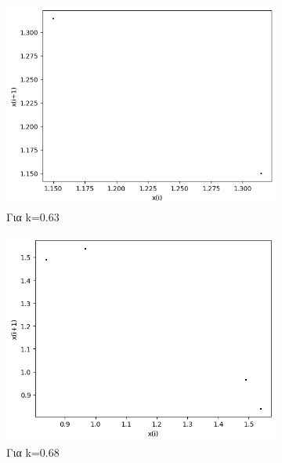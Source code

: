\begin{figure}[h!]
\begin{subfigure}[b]{0.25\textwidth}
		\centering
		\includegraphics[width=\textwidth]{LateX images/graphs q12/g5}
		\caption{Για k=0.63}
		\label{f:k61}
	\end{subfigure}
	\begin{subfigure}[b]{0.25\textwidth}
		\centering
		\includegraphics[width=\textwidth]{LateX images/graphs q12/g6}
		\caption{Για k=0.68}
		\label{f:k62}
	\end{subfigure}
	\hfill
	\begin{subfigure}[b]{0.25\textwidth}
		\centering

\end{subfigure}
\end{figure}
